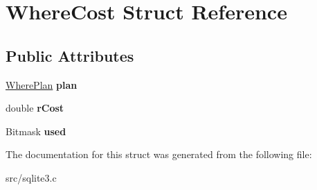 \hypertarget{struct_where_cost}{\section{Where\-Cost Struct Reference}
\label{struct_where_cost}
}
\subsection*{Public Attributes}
\begin{DoxyCompactItemize}
\item 
\hypertarget{struct_where_cost_ace6ca770eb1f123bcbf2ce6433e69822}{\hyperlink{struct_where_plan}{Where\-Plan} {\bfseries plan}}\label{struct_where_cost_ace6ca770eb1f123bcbf2ce6433e69822}

\item 
\hypertarget{struct_where_cost_a4dba436b417d0d562e0a32519befa824}{double {\bfseries r\-Cost}}\label{struct_where_cost_a4dba436b417d0d562e0a32519befa824}

\item 
\hypertarget{struct_where_cost_ab041bae4d0f6cc76f427c82d3840bfae}{Bitmask {\bfseries used}}\label{struct_where_cost_ab041bae4d0f6cc76f427c82d3840bfae}

\end{DoxyCompactItemize}


The documentation for this struct was generated from the following file\-:\begin{DoxyCompactItemize}
\item 
src/sqlite3.\-c\end{DoxyCompactItemize}
